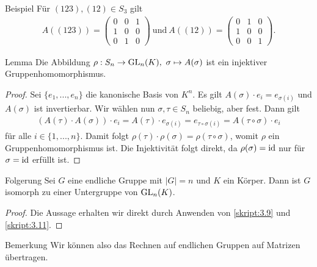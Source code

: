 \begin{generic_no_num}{Beispiel}
	Für $ (123),(12) \in S_3 $ gilt
	\begin{align*}
	A((123)) =  
	\begin{pmatrix}
	0 & 0 & 1 \\
	1 & 0 & 0 \\
	0 & 1 & 0
	\end{pmatrix}
	\ \text{und} \ 
	A((12)) = 
	\begin{pmatrix}
	0 & 1 & 0 \\
	1 & 0 & 0 \\
	0 & 0 & 1
	\end{pmatrix}.
	\end{align*}
\end{generic_no_num}

\begin{genericthm}{Lemma} \label{skript:3.11}
	Die Abbildung $ \rho : S_n \to \Gl_n(K), \ \sigma \mapsto A(\sigma) $
	ist ein injektiver Gruppenhomomorphismus.
\end{genericthm}

\begin{proof}
	Sei $ \lbrace e_1,...,e_n \rbrace $ die kanonische Basis  von $ K^n $.
	Es gilt $ A ( \sigma )\cdot e_i = e_{\sigma(i)} $ und $ A(\sigma)  $ ist invertierbar.
	Wir wählen nun $ \sigma, \tau \in S_n$ beliebig, aber fest. Dann gilt 
	\begin{align*}
	(A(\tau) \cdot A(\sigma)) \cdot e_i = A(\tau) \cdot e_{\sigma(i)} = e_{\tau \circ \sigma (i)} = A(\tau \circ \sigma ) \cdot e_i
	\end{align*}
	für alle $ i \in \lbrace 1,...,n \rbrace $. Damit folgt $ \rho(\tau) \cdot \rho(\sigma) = \rho(\tau \circ \sigma) $, womit 
	$ \rho  $ ein Gruppenhomomorphismus ist.
	Die Injektivität folgt direkt, da $ \rho(\sigma) = \operatorname{id} $ nur für $ \sigma = \operatorname{id}  $ erfüllt ist.
\end{proof}

\begin{genericthm}{Folgerung} \label{skript:3.12}
	Sei $ G $ eine endliche Gruppe mit $ |G|= n $ und $ K $ ein Körper.
	Dann ist $ G $ isomorph zu einer Untergruppe von $ \operatorname{GL}_n(K) $.
\end{genericthm}

\begin{proof}
	Die Aussage erhalten wir direkt durch Anwenden von \ref{skript:3.9} und \ref{skript:3.11}.
\end{proof}

\begin{generic_no_num}{Bemerkung}
	Wir können also das Rechnen auf endlichen Gruppen auf Matrizen übertragen.	
\end{generic_no_num}

